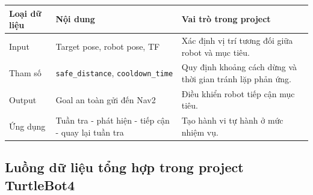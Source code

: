 \renewcommand{\arraystretch}{1.25}
\begin{longtable}{|
  >{\raggedright\arraybackslash}p{}|
  >{\raggedright\arraybackslash}p{}|
  >{\raggedright\arraybackslash}p{}|}
\hline
\textbf{Loại dữ liệu} & \textbf{Nội dung} & \textbf{Vai trò trong project} \\ \hline
\hline
\endhead
\hline
\endlastfoot
Input & Target pose, robot pose, TF & Xác định vị trí tương đối giữa
robot và mục tiêu. \\ \hline
Tham số & \texttt{safe\_distance}, \texttt{cooldown\_time} & Quy định
khoảng cách dừng và thời gian tránh lặp phản ứng. \\ \hline
Output & Goal an toàn gửi đến Nav2 & Điều khiển robot tiếp cận mục
tiêu. \\ \hline
Ứng dụng & Tuần tra - phát hiện - tiếp cận - quay lại tuần tra & Tạo
hành vi tự hành ở mức nhiệm vụ. \\ \hline
\end{longtable}

\subsection{Luồng dữ liệu tổng hợp trong project TurtleBot4}\label{subsec:dataflow}

